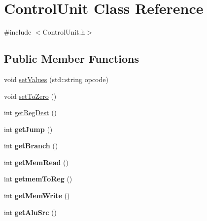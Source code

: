 \hypertarget{class_control_unit}{}\section{Control\+Unit Class Reference}
\label{class_control_unit}


{\ttfamily \#include $<$Control\+Unit.\+h$>$}

\subsection*{Public Member Functions}
\begin{DoxyCompactItemize}
\item 
void \mbox{\hyperlink{class_control_unit_ac8da21614dd49149be858ad36ceb1cb6}{set\+Values}} (std\+::string opcode)
\item 
void \mbox{\hyperlink{class_control_unit_acc570fb783844eb7c25fc0df6163270c}{set\+To\+Zero}} ()
\item 
int \mbox{\hyperlink{class_control_unit_aeddfdfe24c6ec8c46394949c1a50adc7}{get\+Reg\+Dest}} ()
\item 
\mbox{\label{class_control_unit_a6d8d4d2874c72607e34ed8781ff2d64a}} 
int {\bfseries get\+Jump} ()
\item 
\mbox{\label{class_control_unit_a6b3585a68a1f3a8fc7e700063cf4f449}} 
int {\bfseries get\+Branch} ()
\item 
\mbox{\label{class_control_unit_a11ba2693b002766ca5652e972d69f01a}} 
int {\bfseries get\+Mem\+Read} ()
\item 
\mbox{\label{class_control_unit_a49650b7b8f354da8f04f8f9533931322}} 
int {\bfseries getmem\+To\+Reg} ()
\item 
\mbox{\label{class_control_unit_a7fc9545b8dd4a871e1f64b78cf914773}} 
int {\bfseries get\+Mem\+Write} ()
\item 
\mbox{\label{class_control_unit_aa08e98486f69fc1ebc87509fb8eebb9f}} 
int {\bfseries get\+Alu\+Src} ()
\item 
\mbox{\label{class_control_unit_a36411dc5a7ac1e55db4d8dfa47f91e6b}} 

\end{DoxyCompactItemize}
